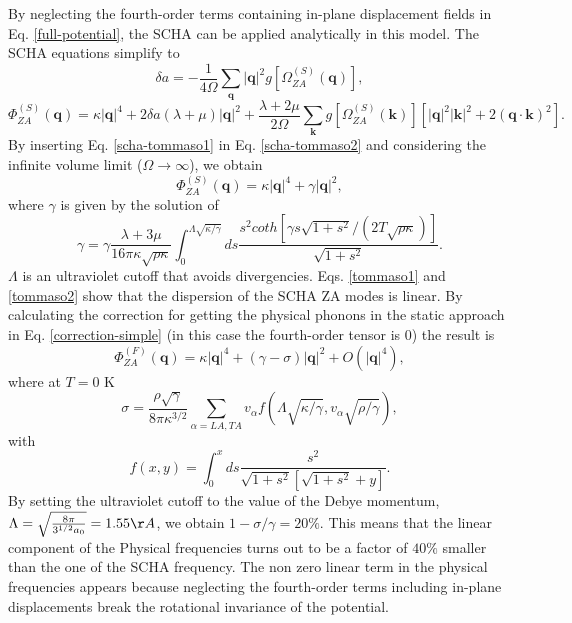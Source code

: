 By neglecting the fourth-order terms containing in-plane displacement fields in Eq. \ref{full-potential}, the SCHA 
can be applied analytically in this model. The SCHA equations simplify to
\begin{equation}
\label{scha-tommaso1}
\delta a=-\frac{1}{4\Omega}\sum_{\boldsymbol{q}}|\boldsymbol{q}|^{2}g[\Omega_{ZA}^{(S)}(\boldsymbol{q})],
\end{equation}
\begin{equation}
\label{scha-tommaso2}
\Phi_{ZA}^{(S)}(\boldsymbol{q})=\kappa|\boldsymbol{q}|^{4}+2\delta a(\lambda+\mu)|\boldsymbol{q}|^{2}+\frac{\lambda+2\mu}{2\Omega}\sum_{\boldsymbol{k}}g[\Omega_{ZA}^{(S)}(\boldsymbol{k})][|\boldsymbol{q}|^{2}|\boldsymbol{k}|^{2}+2(\boldsymbol{q}\cdot\boldsymbol{k})^{2}].
\end{equation}
By inserting Eq. \ref{scha-tommaso1} in Eq. \ref{scha-tommaso2} and considering the infinite volume limit 
($\Omega\rightarrow\infty$), we obtain
\begin{equation}
\label{tommaso1}
\Phi_{ZA}^{(S)}(\boldsymbol{q})=\kappa|\boldsymbol{q}|^{4}+\gamma|\boldsymbol{q}|^{2},
\end{equation}
where $\gamma$ is given by the solution of
\begin{equation}
\label{tommaso2}
\gamma=\gamma\frac{\lambda+3\mu}{16\pi\kappa\sqrt{\rho\kappa}}\int_{0}^{\Lambda\sqrt{\kappa/\gamma}}ds\frac{s^{2}coth[\gamma s\sqrt{1+s^{2}}/(2T\sqrt{\rho\kappa})]}{\sqrt{1+s^{2}}}.
\end{equation}
$\Lambda$ is an ultraviolet cutoff that avoids divergencies.
Eqs. \ref{tommaso1} and \ref{tommaso2} show that the dispersion of the SCHA ZA modes is linear. By calculating the 
correction for getting the physical phonons in the static approach in Eq. \ref{correction-simple} (in this case the 
fourth-order tensor is $0$) the result is
\begin{equation}
\Phi_{ZA}^{(F)}(\boldsymbol{q})=\kappa|\boldsymbol{q}|^{4}+(\gamma-\sigma)|\boldsymbol{q}|^{2}+O(|\boldsymbol{q}|^{4}),
\end{equation}
where at $T=0$ K
\begin{equation}
\sigma=\frac{\rho\sqrt{\gamma}}{8\pi\kappa^{3/2}}\sum_{\alpha=LA,TA}v_{\alpha}f(\Lambda\sqrt{\kappa/\gamma},v_{\alpha}\sqrt{\rho/\gamma}),
\end{equation}
with
\begin{equation}
f(x,y)=\int_{0}^{x}ds\frac{s^{2}}{\sqrt{1+s^{2}}[\sqrt{1+s^{2}}+y]}.
\end{equation}
By setting the ultraviolet cutoff to the value of the Debye momentum, 
$\Lambda=\sqrt{\frac{8\pi}{3^{1/2}a_{0}}}=1.55\AA$, we obtain $1-\sigma/\gamma=20\%$. This means that the linear 
component of the Physical frequencies turns out to be a factor of $40\%$ smaller than the one of the SCHA frequency. 
The non zero linear term in the physical frequencies appears because neglecting the fourth-order terms including 
in-plane displacements break the rotational invariance of the potential.
